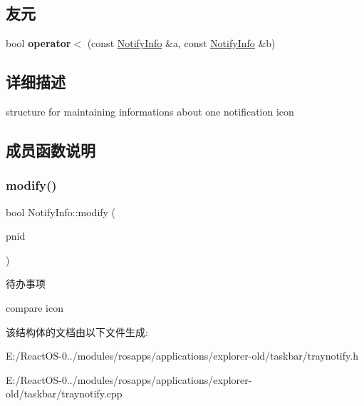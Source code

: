 \subsection*{友元}
\begin{DoxyCompactItemize}
\item 
\mbox{\label{struct_notify_info_afc5bf8b24551a342c1d418879b382698}} 
bool {\bfseries operator$<$} (const \hyperlink{struct_notify_info}{Notify\+Info} \&a, const \hyperlink{struct_notify_info}{Notify\+Info} \&b)
\end{DoxyCompactItemize}


\subsection{详细描述}
structure for maintaining informations about one notification icon 

\subsection{成员函数说明}
\mbox{\label{struct_notify_info_a9dfae22d6f7f370c07ee6d62ba800f83}} 
\subsubsection{\texorpdfstring{modify()}{modify()}}
{\footnotesize\ttfamily bool Notify\+Info\+::modify (\begin{DoxyParamCaption}\item[{\hyperlink{struct___n_o_t_i_f_y_i_c_o_n_d_a_t_a_a}{N\+O\+T\+I\+F\+Y\+I\+C\+O\+N\+D\+A\+TA} $\ast$}]{pnid }\end{DoxyParamCaption})}

\begin{DoxyRefDesc}{待办事项}
\item[\hyperlink{todo__todo000072}{待办事项}]compare icon \end{DoxyRefDesc}


该结构体的文档由以下文件生成\+:\begin{DoxyCompactItemize}
\item 
E\+:/\+React\+O\+S-\/0../modules/rosapps/applications/explorer-\/old/taskbar/traynotify.\+h\item 
E\+:/\+React\+O\+S-\/0../modules/rosapps/applications/explorer-\/old/taskbar/traynotify.\+cpp\end{DoxyCompactItemize}
